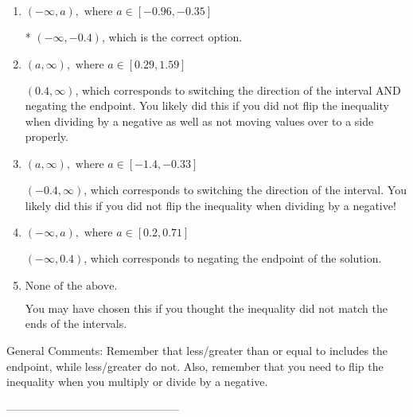 \documentclass{article}[14pt]
\begin{document}
\begin{enumerate}[label=\Alph*.] 
\item $ (-\infty, a), \text{ where } a \in [-0.96, -0.35] $ 

 * $(-\infty, -0.4)$, which is the correct option. 
\item $ (a, \infty), \text{ where } a \in [0.29, 1.59] $ 

  $(0.4, \infty)$, which corresponds to switching the direction of the interval AND negating the endpoint. You likely did this if you did not flip the inequality when dividing by a negative as well as not moving values over to a side properly. 
\item $ (a, \infty), \text{ where } a \in [-1.4, -0.33] $ 

  $(-0.4, \infty)$, which corresponds to switching the direction of the interval. You likely did this if you did not flip the inequality when dividing by a negative! 
\item $ (-\infty, a), \text{ where } a \in [0.2, 0.71] $ 

  $(-\infty, 0.4)$, which corresponds to negating the endpoint of the solution. 
\item $ \text{None of the above}. $ 

 You may have chosen this if you thought the inequality did not match the ends of the intervals. 
\end{enumerate} 
 
General Comments: Remember that less/greater than or equal to includes the endpoint, while less/greater do not. Also, remember that you need to flip the inequality when you multiply or divide by a negative.

-----------------------------------------------
\end{document}
